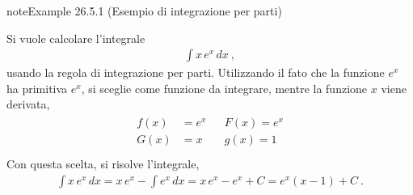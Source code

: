 \documentclass[letterpaper,10pt,italian]{jupyterBook}
\begin{document}
\label{ch/infinitesimal_calculus/integrals:integrals-methods-ixp}
\begin{sphinxadmonition}{note}{Example 26.5.1 (Esempio di integrazione per parti)}



\sphinxAtStartPar
Si vuole calcolare l’integrale
\begin{equation*}
\begin{split}\int x \, e^x \, dx \ ,\end{split}
\end{equation*}
\sphinxAtStartPar
usando la regola di integrazione per parti. Utilizzando il fato che la funzione \(e^x\) ha primitiva \(e^x\), si sceglie come funzione da integrare, mentre la funzione \(x\) viene derivata,
\begin{equation*}
\begin{split}\begin{aligned}
  f(x) & = e^x  && F(x) = e^x \\
  G(x) & =   x  && g(x) = 1   \\
\end{aligned}\end{split}
\end{equation*}
\sphinxAtStartPar
Con questa scelta, si risolve l’integrale,
\begin{equation*}
\begin{split}\int x \, e^x \, dx = x \, e^x - \int e^x \, dx = x \, e^x - e^x + C = e^x (x - 1) + C \ .\end{split}
\end{equation*}\end{sphinxadmonition}
\end{document}
